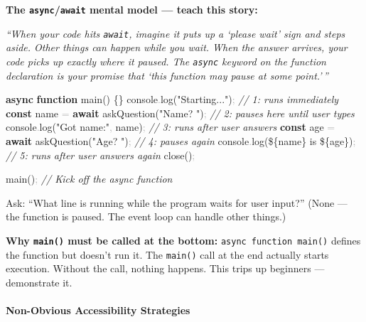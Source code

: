 \documentclass[
  justified,
  openright,
]{tufte-book}
\let\paragraph\paragraph
\newcommand{\KeywordTok}[1]{\textcolor{CodeKeyword}{\textbf{#1}}}  %
\newcommand{\StringTok}[1]{\textcolor{CodeString}{#1}}              %
\newcommand{\CommentTok}[1]{\textcolor{CodeComment}{\textit{#1}}}  %
\newcommand{\CodeFuncTok}[1]{\textcolor{CodeKeyword}{#1}}           %
\newcommand{\OperatorTok}[1]{\textcolor{DarkGray}{#1}}              %
\newenvironment{Shaded}{%
  \begin{mdframed}[style=TufteCode]%
}{%
  \end{mdframed}%
}
\let\paragraph\paragraph
\begin{document}
\textbf{The \texttt{async}/\texttt{await} mental model --- teach this
story:}

\emph{``When your code hits \texttt{await}, imagine it puts up a `please
wait' sign and steps aside. Other things can happen while you wait. When
the answer arrives, your code picks up exactly where it paused. The
\texttt{async} keyword on the function declaration is your promise that
`this function may pause at some point.'\,''}

\begin{Shaded}
\begin{Highlighting}[]
\KeywordTok{async} \KeywordTok{function} \CodeFuncTok{main}() \{\}
  console\OperatorTok{.}\CodeFuncTok{log}(\StringTok{"Starting..."})\OperatorTok{;} \CommentTok{// 1: runs immediately}
  \KeywordTok{const} name \OperatorTok{=} \KeywordTok{await} \CodeFuncTok{askQuestion}(\StringTok{"Name? "})\OperatorTok{;} \CommentTok{// 2: pauses here until user types}
  console\OperatorTok{.}\CodeFuncTok{log}(\StringTok{"Got name:"}\OperatorTok{,} name)\OperatorTok{;} \CommentTok{// 3: runs after user answers}
  \KeywordTok{const} age \OperatorTok{=} \KeywordTok{await} \CodeFuncTok{askQuestion}(\StringTok{"Age? "})\OperatorTok{;} \CommentTok{// 4: pauses again}
  console\OperatorTok{.}\CodeFuncTok{log}(\StringTok{\textasciigrave{}}\StringTok{\$\{}name\StringTok{\}}\StringTok{ is }\StringTok{\$\{}age\StringTok{\}}\StringTok{\textasciigrave{}})\OperatorTok{;} \CommentTok{// 5: runs after user answers again}
  \CodeFuncTok{close}()\OperatorTok{;}
\
 
\CodeFuncTok{main}()\OperatorTok{;} \CommentTok{// Kick off the async function}
\end{Highlighting}
\end{Shaded}

Ask: ``What line is running while the program waits for user input?''
(None --- the function is paused. The event loop can handle other
things.)

\textbf{Why \texttt{main()} must be called at the bottom:}
\texttt{async\ function\ main()} defines the function but doesn't run
it. The \texttt{main()} call at the end actually starts execution.
Without the call, nothing happens. This trips up beginners ---
demonstrate it.

\paragraph{Non-Obvious Accessibility
Strategies}\label{non-obvious-accessibility-strategies-3}
\end{document}

